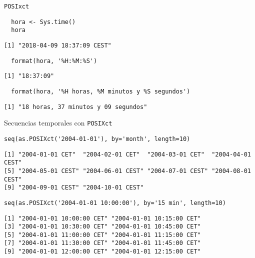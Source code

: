 \documentclass[xcolor={usenames,svgnames,dvipsnames}]{beamer}
\begin{document}
\begin{frame}[fragile,label={sec:org580513d}]{\texttt{POSIxct}}
 \lstset{language=r,label= ,caption= ,captionpos=b,numbers=none}
\begin{lstlisting}
  hora <- Sys.time()
  hora
\end{lstlisting}

\begin{verbatim}
[1] "2018-04-09 18:37:09 CEST"
\end{verbatim}

\lstset{language=r,label= ,caption= ,captionpos=b,numbers=none}
\begin{lstlisting}
  format(hora, '%H:%M:%S')
\end{lstlisting}

\begin{verbatim}
[1] "18:37:09"
\end{verbatim}

\lstset{language=r,label= ,caption= ,captionpos=b,numbers=none}
\begin{lstlisting}
  format(hora, '%H horas, %M minutos y %S segundos')
\end{lstlisting}

\begin{verbatim}
[1] "18 horas, 37 minutos y 09 segundos"
\end{verbatim}
\end{frame}

\begin{frame}[fragile,label={sec:orgb7bdebe}]{Secuencias temporales con \texttt{POSIXct}}
 \lstset{language=r,label= ,caption= ,captionpos=b,numbers=none}
\begin{lstlisting}
seq(as.POSIXct('2004-01-01'), by='month', length=10)
\end{lstlisting}

\begin{verbatim}
[1] "2004-01-01 CET"  "2004-02-01 CET"  "2004-03-01 CET"  "2004-04-01 CEST"
[5] "2004-05-01 CEST" "2004-06-01 CEST" "2004-07-01 CEST" "2004-08-01 CEST"
[9] "2004-09-01 CEST" "2004-10-01 CEST"
\end{verbatim}

\lstset{language=r,label= ,caption= ,captionpos=b,numbers=none}
\begin{lstlisting}
seq(as.POSIXct('2004-01-01 10:00:00'), by='15 min', length=10)
\end{lstlisting}

\begin{verbatim}
[1] "2004-01-01 10:00:00 CET" "2004-01-01 10:15:00 CET"
[3] "2004-01-01 10:30:00 CET" "2004-01-01 10:45:00 CET"
[5] "2004-01-01 11:00:00 CET" "2004-01-01 11:15:00 CET"
[7] "2004-01-01 11:30:00 CET" "2004-01-01 11:45:00 CET"
[9] "2004-01-01 12:00:00 CET" "2004-01-01 12:15:00 CET"
\end{verbatim}
\end{frame}
\end{document}
